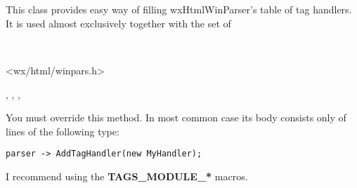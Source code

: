 %

\section{}\label{wxhtmltagsmodule}

This class provides easy way of filling wxHtmlWinParser's table of
tag handlers. It is used almost exclusively together with the set of


\\


<wx/html/winpars.h>




,
,
,


\label{wxhtmltagsmodulefillhandlerstable}


You must override this method. In most common case its body consists
only of lines of the following type:

\begin{verbatim}
parser -> AddTagHandler(new MyHandler);
\end{verbatim}

I recommend using the {\bf TAGS\_MODULE\_*} macros.



